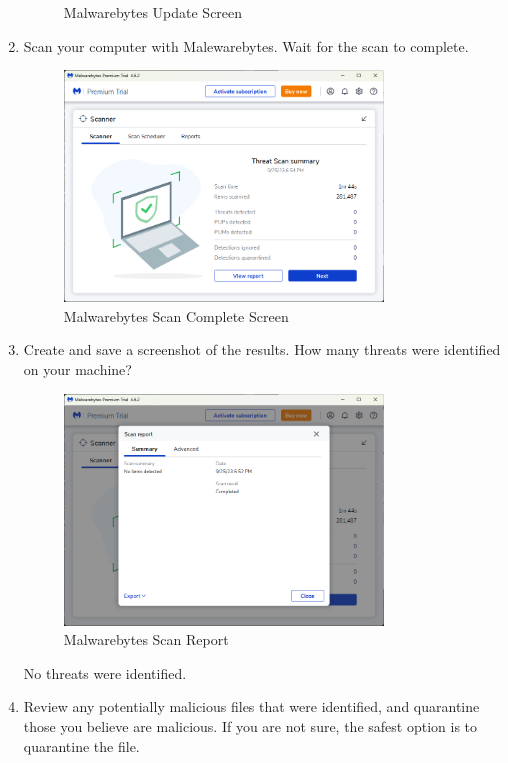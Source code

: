 \documentclass[12pt]{article}
\newenvironment{problem}[2][Problem]{\begin{trivlist}
\item[\hskip \labelsep {\bfseries #1}\hskip \labelsep {\bfseries #2.}]}{\end{trivlist}}
\begin{document}
\begin{problem}{1}
\begin{enumerate}
\begin{figure}[H]
        \caption{Malwarebytes Update Screen}
    \end{figure}
    \item Scan your computer with Malewarebytes. Wait for the scan to complete.
    \begin{figure}[H]
        \centering
        \includegraphics[width=0.8\textwidth]{scan}
        \caption{Malwarebytes Scan Complete Screen}
    \end{figure}
    \pagebreak
    \item Create and save a screenshot of the results. How many threats were identified on your machine?
    \begin{figure}[H]
        \centering
        \includegraphics[width=0.8\textwidth]{report}
        \caption{Malwarebytes Scan Report}
    \end{figure}
    No threats were identified.
    \item Review any potentially malicious files that were identified, and quarantine those you believe are malicious. If you are not sure, the safest option is to quarantine the file.\\\\

\end{enumerate}
\end{problem}
\end{document}

